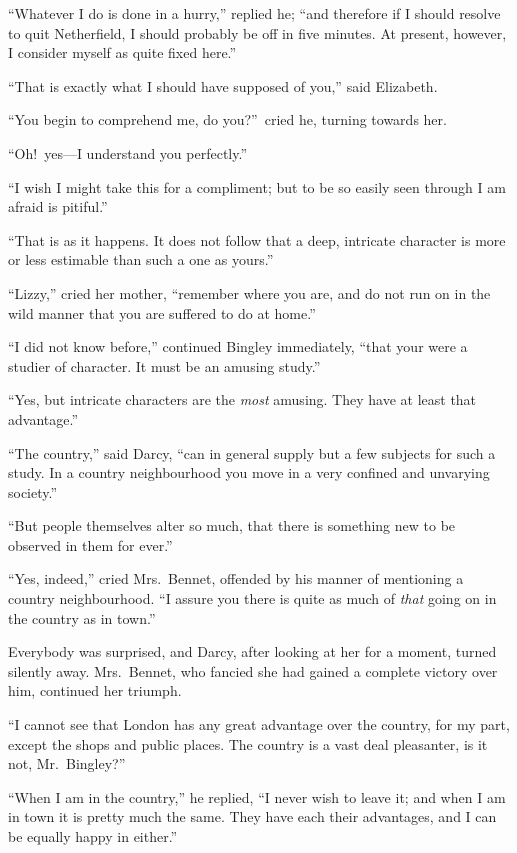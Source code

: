 \documentclass[12pt,english,oneside]{book}
\begin{document}
{}``Whatever I do is done in a hurry,'' replied he; {}``and therefore
if I should resolve to quit Netherfield, I should probably be off
in five minutes. At present, however, I consider myself as quite fixed
here.''

{}``That is exactly what I should have supposed of you,'' said Elizabeth.

{}``You begin to comprehend me, do you?''\ cried he, turning towards
her.

{}``Oh!\ yes\mbox{---}I understand you perfectly.''

{}``I wish I might take this for a compliment; but to be so easily
seen through I am afraid is pitiful.''

{}``That is as it happens. It does not follow that a deep, intricate
character is more or less estimable than such a one as yours.''

{}``Lizzy,'' cried her mother, {}``remember where you are, and
do not run on in the wild manner that you are suffered to do at home.''

{}``I did not know before,'' continued Bingley immediately, {}``that
your were a studier of character. It must be an amusing study.''

{}``Yes, but intricate characters are the \textit{most} amusing.
They have at least that advantage.''

{}``The country,'' said Darcy, {}``can in general supply but a
few subjects for such a study. In a country neighbourhood you move
in a very confined and unvarying society.''

{}``But people themselves alter so much, that there is something
new to be observed in them for ever.''

{}``Yes, indeed,'' cried Mrs.\ Bennet, offended by his manner of
mentioning a country neighbourhood. {}``I assure you there is quite
as much of \textit{that} going on in the country as in town.''

Everybody was surprised, and Darcy, after looking at her for a moment,
turned silently away. Mrs.\ Bennet, who fancied she had gained a
complete victory over him, continued her triumph.

{}``I cannot see that London has any great advantage over the country,
for my part, except the shops and public places. The country is a
vast deal pleasanter, is it not, Mr.\ Bingley?''\


{}``When I am in the country,'' he replied, {}``I never wish to
leave it; and when I am in town it is pretty much the same. They have
each their advantages, and I can be equally happy in either.''
\end{document}
